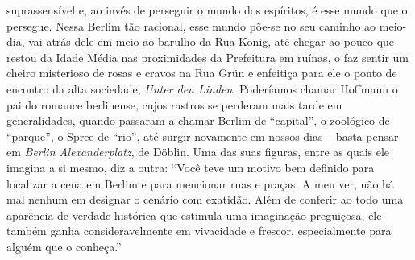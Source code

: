 suprassensível e, ao invés de perseguir o mundo dos espíritos, é esse
mundo que o persegue. Nessa Berlim tão racional, esse mundo põe-se no
seu caminho ao meio-dia, vai atrás dele em meio ao barulho da Rua König,
até chegar ao pouco que restou da Idade Média nas
proximidades da Prefeitura em ruínas, o faz sentir um cheiro misterioso
de rosas e cravos na Rua Grün e enfeitiça para ele o
ponto de encontro da alta sociedade, \emph{Unter den Linden}. Poderíamos
chamar Hoffmann o pai do romance berlinense, cujos rastros se perderam
mais tarde em generalidades, quando passaram a chamar Berlim de
``capital'', o zoológico de ``parque'', o Spree de ``rio'', até surgir
novamente em nossos dias -- basta pensar em \emph{Berlin
Alexanderplatz}, de Döblin. Uma das suas figuras, entre as quais ele
imagina a si mesmo, diz a outra: ``Você teve um motivo bem definido para
localizar a cena em Berlim e para mencionar ruas e praças. A meu ver,
não há mal nenhum em designar o cenário com exatidão. Além de conferir
ao todo uma aparência de verdade histórica que estimula uma imaginação
preguiçosa, ele também ganha consideravelmente em vivacidade e frescor,
especialmente para alguém que o conheça.''

